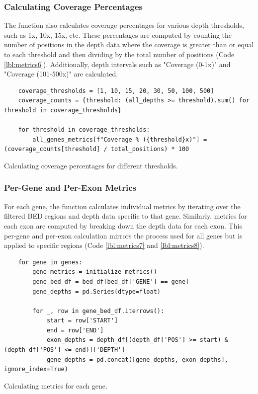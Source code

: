 \subsubsection{\textbf{Calculating Coverage Percentages}}

The function also calculates coverage percentages for various depth thresholds, such as 1x, 10x, 15x, etc. These percentages are computed by counting the number of positions in the depth data where the coverage is greater than or equal to each threshold and then dividing by the total number of positions (Code \ref{lbl:metrics6}). Additionally, depth intervals such as "Coverage (0-1x)" and "Coverage (101-500x)" are calculated.

\begin{longlisting}
\begin{verbatim}
    coverage_thresholds = [1, 10, 15, 20, 30, 50, 100, 500]
    coverage_counts = {threshold: (all_depths >= threshold).sum() for threshold in coverage_thresholds}

    for threshold in coverage_thresholds:
        all_genes_metrics[f"Coverage % ({threshold}x)"] = (coverage_counts[threshold] / total_positions) * 100
\end{verbatim}
\caption{Calculating coverage percentages for different thresholds.}
\label{lbl:metrics6}
\end{longlisting}

\subsubsection{\textbf{Per-Gene and Per-Exon Metrics}}

For each gene, the function calculates individual metrics by iterating over the filtered BED regions and depth data specific to that gene. Similarly, metrics for each exon are computed by breaking down the depth data for each exon. This per-gene and per-exon calculation mirrors the process used for all genes but is applied to specific regions (Code \ref{lbl:metrics7} and \ref{lbl:metrics8}).

\begin{longlisting}
\begin{verbatim}
    for gene in genes:
        gene_metrics = initialize_metrics()
        gene_bed_df = bed_df[bed_df['GENE'] == gene]
        gene_depths = pd.Series(dtype=float)

        for _, row in gene_bed_df.iterrows():
            start = row['START']
            end = row['END']
            exon_depths = depth_df[(depth_df['POS'] >= start) & (depth_df['POS'] <= end)]['DEPTH']
            gene_depths = pd.concat([gene_depths, exon_depths], ignore_index=True)
\end{verbatim}
\caption{Calculating metrics for each gene.}
\label{lbl:metrics7}
\end{longlisting}

